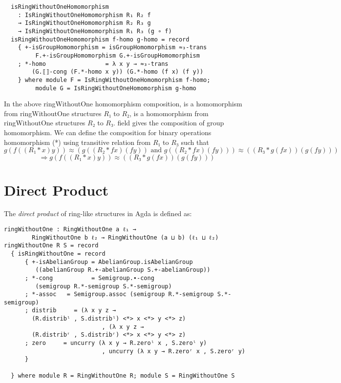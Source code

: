 \begin{verbatim}
  isRingWithoutOneHomomorphism
    : IsRingWithoutOneHomomorphism R₁ R₂ f
    → IsRingWithoutOneHomomorphism R₂ R₃ g
    → IsRingWithoutOneHomomorphism R₁ R₃ (g ∘ f)
  isRingWithoutOneHomomorphism f-homo g-homo = record
    { +-isGroupHomomorphism = isGroupHomomorphism ≈₃-trans
		 F.+-isGroupHomomorphism G.+-isGroupHomomorphism
    ; *-homo                 = λ x y → ≈₃-trans 
		(G.⟦⟧-cong (F.*-homo x y)) (G.*-homo (f x) (f y))
    } where module F = IsRingWithoutOneHomomorphism f-homo;
		 module G = IsRingWithoutOneHomomorphism g-homo
\end{verbatim}
In the above ringWithoutOne homomorphism composition,  is a
homomorphism from ringWithoutOne structures $R₁$ to $R₂$,  is a
homomorphism from ringWithoutOne structures $R₂$ to $R₃$.
 field gives the composition of group homomorphism.
We can define the composition for binary operations homomorphism (*) using
transitive relation  from $R₁$ to $R₃$ such that \[g (f ((R₁ * x)
y)) ≈ (g ((R₂ * f x) (f y)) \text{ and } g ((R₂ * f x) (f y))) ≈ ((R₃ * g (f x))
(g (f y)))\]
\[\Rightarrow g (f ((R₁ * x) y)) ≈ ((R₃ * g (f x)) (g (f y)))\]

\section{Direct Product}
The \textit{direct product} of ring-like structures in Agda is defined as:

\begin{verbatim}
ringWithoutOne : RingWithoutOne a ℓ₁ → 
		RingWithoutOne b ℓ₂ → RingWithoutOne (a ⊔ b) (ℓ₁ ⊔ ℓ₂)
ringWithoutOne R S = record
  { isRingWithoutOne = record
      { +-isAbelianGroup = AbelianGroup.isAbelianGroup
		 ((abelianGroup R.+-abelianGroup S.+-abelianGroup))
      ; *-cong           = Semigroup.∙-cong
		 (semigroup R.*-semigroup S.*-semigroup)
      ; *-assoc   = Semigroup.assoc (semigroup R.*-semigroup S.*-semigroup)
      ; distrib     = (λ x y z → 
		(R.distribˡ , S.distribˡ) <*> x <*> y <*> z)
                            , (λ x y z → 
		(R.distribʳ , S.distribʳ) <*> x <*> y <*> z)
      ; zero     = uncurry (λ x y → R.zeroˡ x , S.zeroˡ y)
                            , uncurry (λ x y → R.zeroʳ x , S.zeroʳ y)
      }

  } where module R = RingWithoutOne R; module S = RingWithoutOne S
\end{verbatim}


